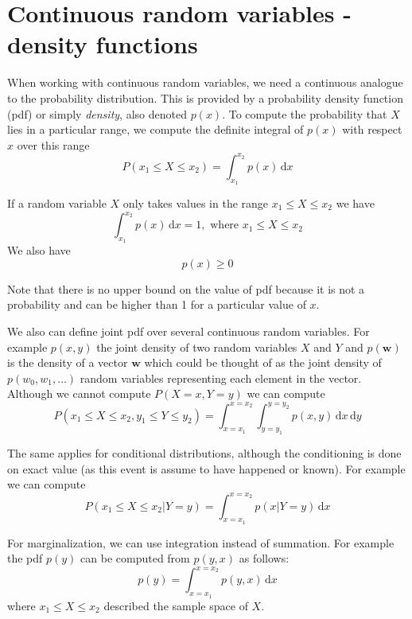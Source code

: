 \documentclass[a4paper,11pt]{article} %
\begin{document}
\section{Continuous random variables - density functions}

When working with continuous random variables, we need a continuous analogue to the probability
distribution. This is provided by a probability density function (pdf) or simply \emph{density},
also denoted $p(x)$.
To compute the probability that $X$ lies in a particular range, we compute the
definite integral of $p(x)$ with respect $x$ over this range
\begin{equation*}
P(x_1 \leq X \leq x_2) = \int_{x_1}^{x_2} p(x)\,\mathrm{d}x
\end{equation*}

If a random variable $X$ only takes values in the range $x_1 \leq X \leq x_2$ we have
\begin{equation}
\int_{x_1}^{x_2} p(x)\,\mathrm{d}x = 1,\,\,\text{where } x_1 \leq X \leq x_2
\end{equation}
We also have
\begin{equation}
p(x) \geq 0
\end{equation}

Note that there is no upper bound on the value of pdf because it is not a probability and can
be higher than 1 for a particular value of $x$.

We also can define joint pdf over several continuous random variables.
For example $p(x,y)$ the joint density of two random variables $X$ and $Y$ and
$p(\mathbf{w})$ is the density of a vector $\mathbf{w}$ which could be thought of
as the joint density of $p(w_0, w_1, \ldots)$ random variables representing each
element in the vector. Although we cannot compute $P(X=x,Y=y)$ we can compute
\begin{equation}
P(x_1 \leq X \leq x_2, y_1 \leq Y \leq y_2) = 
\int_{x=x_1}^{x=x_2} \int_{y=y_1}^{y=y_2} p(x,y)\,\mathrm{d}x\,\mathrm{d}y
\end{equation}

The same applies for conditional distributions, although the conditioning is done
on exact value (as this event is assume to have happened or known). For example
we can compute
\begin{equation*}
P(x_1 \leq X \leq x_2 | Y = y) = \int_{x=x_1}^{x=x_{2}} p(x|Y=y)\,\mathrm{d}x
\end{equation*}

For marginalization, we can use integration instead of summation. For example the
pdf $p(y)$ can be computed from $p(y,x)$ as follows:
\begin{equation*}
p(y) = \int_{x=x_1}^{x=x_2} p(y,x)\,\mathrm{d}x
\end{equation*}
where $x_1 \leq X \leq x_2$ described the sample space of $X$.
\end{document}

